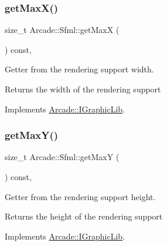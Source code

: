 \subsubsection{\texorpdfstring{get\+Max\+X()}{getMaxX()}}
{\footnotesize\ttfamily size\+\_\+t Arcade\+::\+Sfml\+::get\+MaxX (\begin{DoxyParamCaption}{ }\end{DoxyParamCaption}) const\hspace{0.3cm}{\ttfamily [final]}, {\ttfamily [virtual]}}



Getter from the rendering support width. 

\begin{DoxyReturn}{Returns}
the width of the rendering support 
\end{DoxyReturn}


Implements \hyperlink{class_arcade_1_1_i_graphic_lib_a41a3c00970ecd16e1893105de2091a55}{Arcade\+::\+I\+Graphic\+Lib}.

\mbox{\label{class_arcade_1_1_sfml_a90cb12cc852a0198074f55be843d6f99}} 
\subsubsection{\texorpdfstring{get\+Max\+Y()}{getMaxY()}}
{\footnotesize\ttfamily size\+\_\+t Arcade\+::\+Sfml\+::get\+MaxY (\begin{DoxyParamCaption}{ }\end{DoxyParamCaption}) const\hspace{0.3cm}{\ttfamily [final]}, {\ttfamily [virtual]}}



Getter from the rendering support height. 

\begin{DoxyReturn}{Returns}
the height of the rendering support 
\end{DoxyReturn}


Implements \hyperlink{class_arcade_1_1_i_graphic_lib_ae8701e702b51189c84b1900dd624912e}{Arcade\+::\+I\+Graphic\+Lib}.

\mbox{\label{class_arcade_1_1_sfml_a6c5776e27ea7466208ab4bd59395e344}} 
